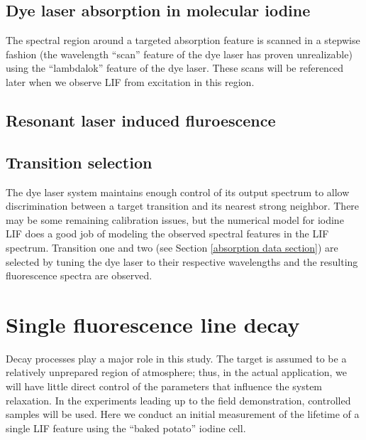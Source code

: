 \subsection{Dye laser absorption in molecular iodine}
The spectral region around a targeted absorption feature is scanned in a stepwise fashion (the wavelength ``scan'' feature of the dye laser has proven unrealizable) using the ``lambdalok'' feature of the dye laser. These scans will be referenced later when we observe LIF from excitation in this region.




\subsection{Resonant laser induced fluroescence}
\label{res LIF section}



\subsection{Transition selection}
The dye laser system maintains enough control of its output spectrum to allow discrimination between a target transition and its nearest strong neighbor. There may be some remaining calibration issues, but the numerical model for iodine LIF does a good job of modeling the observed spectral features in the LIF spectrum. Transition one and two (see Section \ref{absorption data section}) are selected by tuning the dye laser to their respective wavelengths and the resulting fluorescence spectra are observed.




\section{Single fluorescence line decay}
Decay processes play a major role in this study. The target is assumed to be a relatively unprepared region of atmosphere; thus, in the actual application, we will have little direct control of the parameters that influence the system relaxation. In the experiments leading up to the field demonstration, controlled samples will be used. Here we conduct an initial measurement of the lifetime of a single LIF feature using the ``baked potato'' iodine cell.
